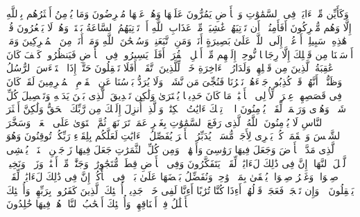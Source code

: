 \startbuffer[\q:12:105]
وَكَأَیِّن مِّنۡ ءَایَةࣲ فِی ٱلسَّمَٰوَٰتِ وَٱلۡأَرۡضِ یَمُرُّونَ عَلَیۡهَا وَهُمۡ عَنۡهَا مُعۡرِضُونَ%
\stopbuffer
\startbuffer[\q:12:106]
وَمَا یُؤۡمِنُ أَكۡثَرُهُم بِٱللَّهِ إِلَّا وَهُم مُّشۡرِكُونَ%
\stopbuffer
\startbuffer[\q:12:107]
أَفَأَمِنُوۤا۟ أَن تَأۡتِیَهُمۡ غَٰشِیَةࣱ مِّنۡ عَذَابِ ٱللَّهِ أَوۡ تَأۡتِیَهُمُ ٱلسَّاعَةُ بَغۡتَةࣰ وَهُمۡ لَا یَشۡعُرُونَ%
\stopbuffer
\startbuffer[\q:12:108]
قُلۡ هَٰذِهِۦ سَبِیلِیۤ أَدۡعُوۤا۟ إِلَى ٱللَّهِۚ عَلَىٰ بَصِیرَةٍ أَنَا۠ وَمَنِ ٱتَّبَعَنِیۖ وَسُبۡحَٰنَ ٱللَّهِ وَمَاۤ أَنَا۠ مِنَ ٱلۡمُشۡرِكِینَ%
\stopbuffer
\startbuffer[\q:12:109]
وَمَاۤ أَرۡسَلۡنَا مِن قَبۡلِكَ إِلَّا رِجَالࣰا نُّوحِیۤ إِلَیۡهِم مِّنۡ أَهۡلِ ٱلۡقُرَىٰۤۗ أَفَلَمۡ یَسِیرُوا۟ فِی ٱلۡأَرۡضِ فَیَنظُرُوا۟ كَیۡفَ كَانَ عَٰقِبَةُ ٱلَّذِینَ مِن قَبۡلِهِمۡۗ وَلَدَارُ ٱلۡءَاخِرَةِ خَیۡرࣱ لِّلَّذِینَ ٱتَّقَوۡا۟ۚ أَفَلَا تَعۡقِلُونَ%
\stopbuffer
\startbuffer[\q:12:110]
حَتَّىٰۤ إِذَا ٱسۡتَیۡءَسَ ٱلرُّسُلُ وَظَنُّوۤا۟ أَنَّهُمۡ قَدۡ كُذِبُوا۟ جَاۤءَهُمۡ نَصۡرُنَا فَنُجِّیَ مَن نَّشَاۤءُۖ وَلَا یُرَدُّ بَأۡسُنَا عَنِ ٱلۡقَوۡمِ ٱلۡمُجۡرِمِینَ%
\stopbuffer
\startbuffer[\q:12:111]
لَقَدۡ كَانَ فِی قَصَصِهِمۡ عِبۡرَةࣱ لِّأُو۟لِی ٱلۡأَلۡبَٰبِۗ مَا كَانَ حَدِیثࣰا یُفۡتَرَىٰ وَلَٰكِن تَصۡدِیقَ ٱلَّذِی بَیۡنَ یَدَیۡهِ وَتَفۡصِیلَ كُلِّ شَیۡءࣲ وَهُدࣰى وَرَحۡمَةࣰ لِّقَوۡمࣲ یُؤۡمِنُونَ%
\stopbuffer
\startbuffer[\q:13:1]
الۤمۤرۚ تِلۡكَ ءَایَٰتُ ٱلۡكِتَٰبِۗ وَٱلَّذِیۤ أُنزِلَ إِلَیۡكَ مِن رَّبِّكَ ٱلۡحَقُّ وَلَٰكِنَّ أَكۡثَرَ ٱلنَّاسِ لَا یُؤۡمِنُونَ%
\stopbuffer
\startbuffer[\q:13:2]
ٱللَّهُ ٱلَّذِی رَفَعَ ٱلسَّمَٰوَٰتِ بِغَیۡرِ عَمَدࣲ تَرَوۡنَهَاۖ ثُمَّ ٱسۡتَوَىٰ عَلَى ٱلۡعَرۡشِۖ وَسَخَّرَ ٱلشَّمۡسَ وَٱلۡقَمَرَۖ كُلࣱّ یَجۡرِی لِأَجَلࣲ مُّسَمࣰّىۚ یُدَبِّرُ ٱلۡأَمۡرَ یُفَصِّلُ ٱلۡءَایَٰتِ لَعَلَّكُم بِلِقَاۤءِ رَبِّكُمۡ تُوقِنُونَ%
\stopbuffer
\startbuffer[\q:13:3]
وَهُوَ ٱلَّذِی مَدَّ ٱلۡأَرۡضَ وَجَعَلَ فِیهَا رَوَٰسِیَ وَأَنۡهَٰرࣰاۖ وَمِن كُلِّ ٱلثَّمَرَٰتِ جَعَلَ فِیهَا زَوۡجَیۡنِ ٱثۡنَیۡنِۖ یُغۡشِی ٱلَّیۡلَ ٱلنَّهَارَۚ إِنَّ فِی ذَٰلِكَ لَءَایَٰتࣲ لِّقَوۡمࣲ یَتَفَكَّرُونَ%
\stopbuffer
\startbuffer[\q:13:4]
وَفِی ٱلۡأَرۡضِ قِطَعࣱ مُّتَجَٰوِرَٰتࣱ وَجَنَّٰتࣱ مِّنۡ أَعۡنَٰبࣲ وَزَرۡعࣱ وَنَخِیلࣱ صِنۡوَانࣱ وَغَیۡرُ صِنۡوَانࣲ یُسۡقَىٰ بِمَاۤءࣲ وَٰحِدࣲ وَنُفَضِّلُ بَعۡضَهَا عَلَىٰ بَعۡضࣲ فِی ٱلۡأُكُلِۚ إِنَّ فِی ذَٰلِكَ لَءَایَٰتࣲ لِّقَوۡمࣲ یَعۡقِلُونَ%
\stopbuffer
\startbuffer[\q:13:5]
۞ وَإِن تَعۡجَبۡ فَعَجَبࣱ قَوۡلُهُمۡ أَءِذَا كُنَّا تُرَٰبًا أَءِنَّا لَفِی خَلۡقࣲ جَدِیدٍۗ أُو۟لَٰۤئِكَ ٱلَّذِینَ كَفَرُوا۟ بِرَبِّهِمۡۖ وَأُو۟لَٰۤئِكَ ٱلۡأَغۡلَٰلُ فِیۤ أَعۡنَاقِهِمۡۖ وَأُو۟لَٰۤئِكَ أَصۡحَٰبُ ٱلنَّارِۖ هُمۡ فِیهَا خَٰلِدُونَ%
\stopbuffer
\startbuffer[\q:13:6]
